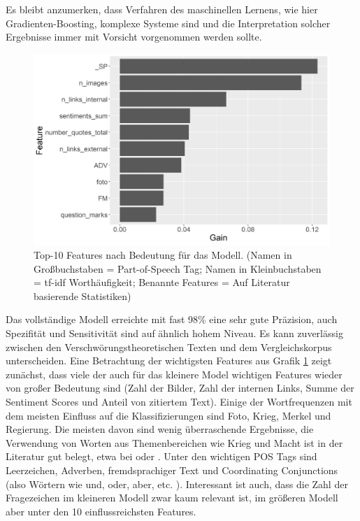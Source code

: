 Es bleibt anzumerken, dass Verfahren des maschinellen Lernens, wie hier Gradienten-Boosting, komplexe Systeme sind und die Interpretation solcher Ergebnisse immer mit Vorsicht vorgenommen werden sollte.

\begin{figure}[h]
    \centering
    \includegraphics[scale=0.45]{graphics/top_10_features.jpg}
    \caption{Top-10 Features nach Bedeutung für das Modell. (Namen in Großbuchstaben = Part-of-Speech Tag; Namen in Kleinbuchstaben = tf-idf Worthäufigkeit; Benannte Features = Auf Literatur basierende Statistiken)}
    \label{top-features}
\end{figure}

\FloatBarrier

Das vollständige Modell erreichte mit fast 98\% eine sehr gute Präzision, auch Spezifität und Sensitivität sind auf ähnlich hohem Niveau.
Es kann zuverlässig zwischen den Verschwörungstheoretischen Texten und dem Vergleichskorpus unterscheiden.
Eine Betrachtung der wichtigsten Features aus Grafik \ref{top-features} zeigt zunächst, dass viele der auch für das kleinere Model wichtigen Features wieder von großer Bedeutung sind (Zahl der Bilder, Zahl der internen Links, Summe der Sentiment Scores und Anteil von zitiertem Text).
Einige der Wortfrequenzen mit dem meisten Einfluss auf die Klassifizierungen sind Foto, Krieg, Merkel und Regierung.
Die meisten davon sind wenig überraschende Ergebnisse, die Verwendung von Worten aus Themenbereichen wie Krieg und Macht ist in der Literatur gut belegt, etwa bei \textcite[150]{stumpf_2019} oder \textcite[25]{uscinski_2014}.
Unter den wichtigen POS Tags sind Leerzeichen, Adverben, fremdsprachiger Text und Coordinating Conjunctions (also Wörtern wie und, oder, aber, etc. \parencite[vgl.][]{smith_2003}).
Interessant ist auch, dass die Zahl der Fragezeichen im kleineren Modell zwar kaum relevant ist, im größeren Modell aber unter den 10 einflussreichsten Features.

